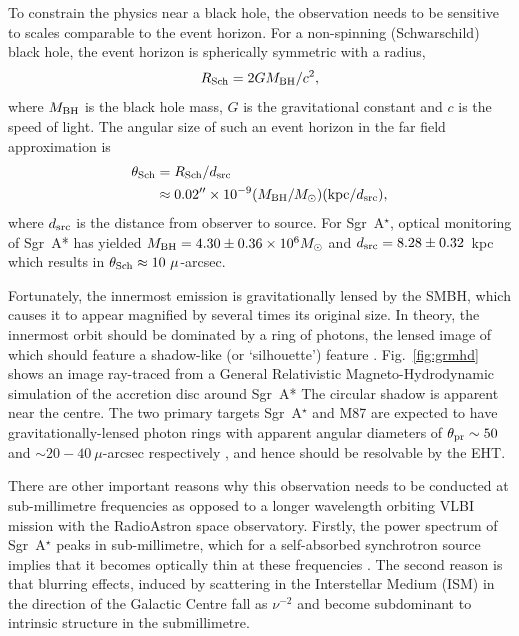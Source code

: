 To constrain the physics near a black hole, the observation needs to be sensitive to scales comparable to the event horizon. For a non-spinning (Schwarschild) black hole, the event horizon is spherically symmetric with a radius, 
\begin{equation}
R_{\rm Sch} = 2 G M_{\rm BH} /c^2,
\end{equation}
where $M_{\rm BH}$ is the black hole mass, $G$ is the gravitational constant and $c$ is the speed of light. The angular size of such an event horizon in the far field approximation is
\begin{align}
\theta_{\rm Sch} &= R_{\rm Sch} / d_{\rm src}\\
&\approx 0.02^{\prime \prime} \times 10^{-9} (M_{\rm BH}/M_\odot)({\rm kpc}/d_{\rm src}),
\end{align}
where $d_{\rm src}$ is the distance from observer to source. For Sgr~A$^\star$, optical monitoring of Sgr~A* \citep{Gillessen_2009} has yielded $M_{\rm BH} = 4.30 \pm 0.36 \times 10^{6} M_\odot$ and $d_{\rm src}= 8.28 \pm 0.32$~kpc which results in $\theta_{\rm Sch} \approx 10\ \mu$-arcsec. 

Fortunately, the innermost emission is gravitationally lensed by the SMBH, which causes it to appear magnified by several times its original size. In theory, the innermost orbit should be dominated by a ring of photons, the lensed image of which should feature a shadow-like (or `silhouette') feature \citep[e.g.][]{Johannsen_2010}. Fig.~\ref{fig:grmhd} shows an image ray-traced from a General Relativistic Magneto-Hydrodynamic simulation of the accretion disc around Sgr~A* \citep{Moscibrodzka_2014} The circular shadow is apparent near the centre. The two primary targets Sgr~A$^\star$ and M87 are expected to have gravitationally-lensed photon rings with apparent angular diameters of $\theta_{\rm pr} \sim 50$ and $\sim 20-40\ \mu$-arcsec respectively \citep*{Falcke_2013,Broderick_2009}, and hence should be resolvable by the EHT. 

There are other important reasons why this observation needs to be conducted at sub-millimetre frequencies as opposed to a longer wavelength orbiting VLBI mission with the RadioAstron space observatory. Firstly, the power spectrum of Sgr~A$^\star$ peaks in sub-millimetre, which for a self-absorbed synchrotron source implies that it becomes optically thin at these frequencies \citep{Serabyn_1997,Falcke_1998}.
The second reason is that blurring effects, induced by scattering in the Interstellar Medium (ISM) in the direction of the Galactic Centre \citep[e.g.][]{Fish_2014} fall as $\nu^{-2}$ and become subdominant to intrinsic structure in the submillimetre.


